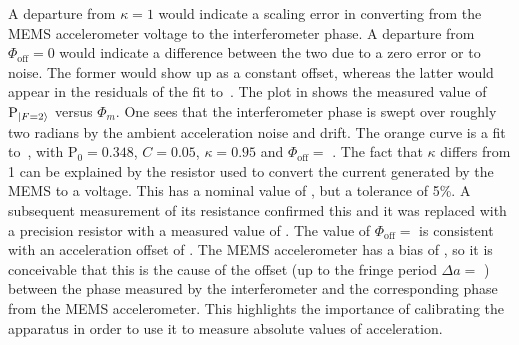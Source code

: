 A departure from $\kappa = 1$ would indicate a scaling error in
converting from the MEMS accelerometer voltage to the interferometer
phase. A departure from $\Phi_\text{off} = 0$ would indicate a
difference between the two due to a zero error or to noise. The former
would show up as a constant offset, whereas the latter would appear in
the residuals of the fit to~.
The plot in  shows the measured value of
$\text{P}_{\ket{F=2}}$ versus $\Phi_m$. One sees that the
interferometer phase is swept over roughly two radians by the ambient
acceleration noise and drift. The orange curve is a fit
to~, with $\text{P}_0 = 0.348$,
$C = 0.05$, $\kappa = 0.95$ and $\Phi_\text{off} =$
. The fact that $\kappa$ differs from 1 can be
explained by the resistor used to convert the current generated by the
MEMS to a voltage. This has a nominal value of
, but a tolerance of 5\%. A subsequent
measurement of its resistance confirmed this and it was replaced with
a  precision resistor with a measured value of
. The value of $\Phi_\text{off} =
$ is consistent with an acceleration offset of
. The MEMS accelerometer
has a bias of , so it is conceivable that this
is the cause of the offset (up to the fringe period $\Delta a =$
) between the phase measured by the
interferometer and the corresponding phase from the MEMS
accelerometer. This highlights the importance of calibrating the
apparatus in order to use it to measure absolute values of
acceleration.
